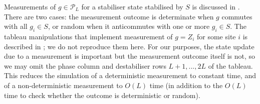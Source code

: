 \documentclass[10pt]{article}
\begin{document}
\begin{appendices}
Measurements of $g \in \mathcal{P}_L$ for a stabiliser state stabilised by $S$ is discussed in \cite{nielsen2002quantum}. There are two cases: the measurement outcome is determinate when $g$ commutes with all $g_i \in S$, or random when it anticommutes with one or more $g_i \in S$. The tableau manipulations that implement measurement of $g=Z_i$ for some site $i$ is described in \cite{aaronson2004improved}; we do not reproduce them here. For our purposes, the state update due to a measurement is important but the measurement outcome itself is not, so we may omit the phase column and destabiliser rows $L+1,...,2L$ of the tableau. This reduces the simulation of a deterministic measurement to constant time, and of a non-deterministic measurement to $O(L)$ time (in addition to the $O(L)$ time to check whether the outcome is deterministic or random). 


\begin{comment}

Now to implement projective measurements. Suppose a $L$-qubit stabiliser state is stabilised by $S=\ev{g_j}_{j=1}^L$. We are interested in measuring $g \in \mathcal{P}_L$. Suppose WLOG $g$ has no coefficient $-1$ or $\pm i$. There are two cases:

(1) $g$ commutes with all $g \in S$. Then $g \in S$ and the measurement yields $+1$, or $-g \in S$ and the measurement yields $-1$ [Nielson]. So this case is a measurement deterministic outcome. For our purposes, we are interested in special case where $g=Z_a$ for some site $a$. In the tableau, this is equivalent to checking all the rows $i$ for which $x_{ia}=1$, multiplying together the stabilisers they represent, and checking the phase of that

Suppose we have a state stabilised by $S$, set of generators in $\mathcal{P}_n$. To measure $h \in \mathcal{P}_n$, assume WLOG $h$ has no coefficeint of $-1$ or $\pm i$. There are two cases: (1) $h$ commutes with all $g \in S$, (2) $h$ anticommutes with exactly one $g \in S$, say $g_1$ (this can be done WLOG, by replacing any other $g_j$ for which $\{h,g_j\}=0$ with $g_1 g_j$). Following measurement, the generators describing the state transform as

Case (1): $g$ or $-g$ is in the stabiliser, because $g^2=I$ and $g\ket{\psi} \in V_S$.

Case (2): $g$ anticommutes witht some $g \in S$, say $g_1$ by relabelling. in the stabiliser generators $g_1$ is replaced by $g$ or $-g$ depending on whether the measurement yields $+1$ or $-1$.


\end{comment}
\end{appendices}
\end{document}
